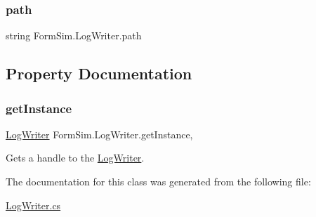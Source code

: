 \mbox{\label{class_form_sim_1_1_log_writer_ac5a2e70a6686c89095cb405bb5b5c7ea}} 
\subsubsection{\texorpdfstring{path}{path}}
{\footnotesize\ttfamily string Form\+Sim.\+Log\+Writer.\+path\hspace{0.3cm}{\ttfamily [private]}}



\subsection{Property Documentation}
\mbox{\label{class_form_sim_1_1_log_writer_ac885dc41c236f618e066cdcee8189f64}} 
\subsubsection{\texorpdfstring{get\+Instance}{getInstance}}
{\footnotesize\ttfamily \mbox{\hyperlink{class_form_sim_1_1_log_writer}{Log\+Writer}} Form\+Sim.\+Log\+Writer.\+get\+Instance\hspace{0.3cm}{\ttfamily [static]}, {\ttfamily [get]}}



Gets a handle to the \mbox{\hyperlink{class_form_sim_1_1_log_writer}{Log\+Writer}}. 



The documentation for this class was generated from the following file\+:\begin{DoxyCompactItemize}
\item 
\mbox{\hyperlink{_log_writer_8cs}{Log\+Writer.\+cs}}\end{DoxyCompactItemize}
